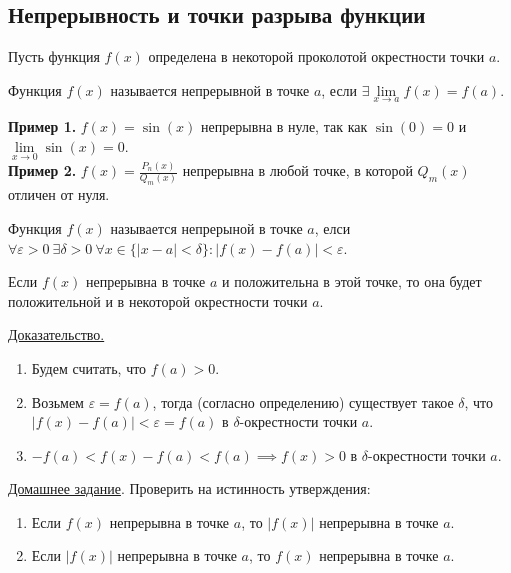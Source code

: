 \documentclass{article}
\begin{document}
\subsection{Непрерывность и точки разрыва функции}
Пусть функция \(f(x)\) определена в некоторой проколотой окрестности точки \(a\).  
\begin{definition}
    Функция \(f(x)\) называется непрерывной в точке \(a\), если \(\exists \lim\limits_{x \to a}f(x) = f(a)\).   
\end{definition}
\noindent
\textbf{Пример 1.} \(f(x) = \sin(x)\) непрерывна в нуле, так как \(\sin(0) = 0\) и \(\lim\limits_{x \to 0}\sin(x) = 0\).\\
\textbf{Пример 2.} \(\displaystyle f(x) = \frac{P_{n}(x)}{Q_{m}(x)}\) непрерывна в любой точке, в которой \(Q_{m}(x)\) отличен от нуля.
\begin{definition}
    Функция \(f(x)\) называется непрерыной в точке \(a\), елси \(\forall \varepsilon > 0\ \exists \delta > 0\ \forall x \in \{\vert x - a \vert < \delta\}: \vert f(x) - f(a) \vert < \varepsilon\).   
\end{definition}
\noindent

\begin{claim}
    Если \(f(x)\) непрерывна в точке \(a\) и положительна в этой точке, то она будет положительной и в некоторой окрестности точки \(a\).
\end{claim}
\noindent
\underline{Доказательство.}
\begin{enumerate}
    \item Будем считать, что \(f(a) > 0\).
    \item Возьмем \(\varepsilon = f(a)\), тогда (согласно определению) существует такое \(\delta\), что \(\vert f(x) - f(a) \vert < \varepsilon = f(a)\) в \(\delta\)-окрестности точки \(a\). 
    \item \(-f(a) < f(x) - f(a) < f(a) \implies f(x) > 0\) в \(\delta\)-окрестности точки \(a\).
\end{enumerate}
\noindent
\underline{Домашнее задание}. Проверить на истинность утверждения:
\begin{enumerate}
    \item Если \(f(x)\) непрерывна в точке \(a\), то \(\vert f(x) \vert\) непрерывна в точке \(a\).
    \item Если \(\vert f(x) \vert\) непрерывна в точке \(a\), то \(f(x)\) непрерывна в точке \(a\).    
\end{enumerate}
\end{document}
